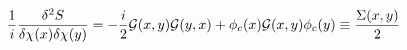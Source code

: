 \begin{equation}
\frac{1}{i} \frac {\delta^2 S}{\delta \chi(x) \delta \chi (y)} =
-\frac{i}{2}
{\cal G} (x,y) {\cal G}(y,x) + \phi_c(x) {\cal G}(x,y) \phi_c(y) \equiv
\frac
{\Sigma(x,y)}{2}
\end{equation}


